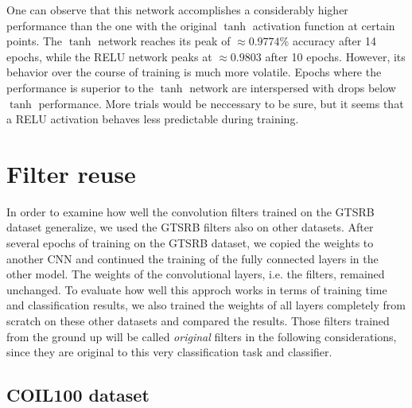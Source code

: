 \documentclass[11pt, a4paper]{article}
\begin{document}
One can observe that this network accomplishes a considerably higher performance than the one with the original $\tanh$ activation function at certain points. The $\tanh$ network reaches its peak of $\approx 0.9774$\% accuracy after 14 epochs, while the RELU network peaks at $\approx 0.9803$ after 10 epochs. However, its behavior over the course of training is much more volatile. Epochs where the performance is superior to the $\tanh$ network are interspersed with drops below $\tanh$ performance. More trials would be neccessary to be sure, but it seems that a RELU activation behaves less predictable during training.


\section{Filter reuse}

In order to examine how well the convolution filters trained on the GTSRB dataset generalize, we used the GTSRB filters also on other datasets. After several epochs of training on the GTSRB dataset, we copied the weights to another CNN and continued the training of the fully connected layers in the other model. The weights of the convolutional layers, i.e. the filters, remained unchanged. To evaluate how well this approch works in terms of training time and classification results, we also trained the weights of all layers completely from scratch on these other datasets and compared the results. Those filters trained from the ground up will be called \textit{original} filters in the following considerations, since they are original to this very classification task and classifier.

\subsection{COIL100 dataset}
\end{document}

